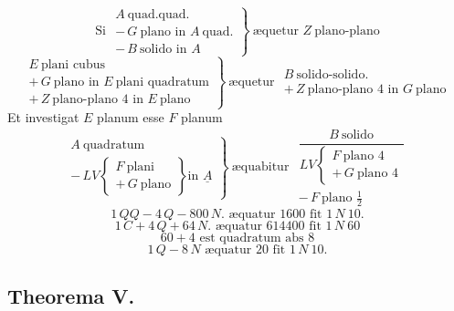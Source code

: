 \documentclass[11pt,a4paper]{article}
\begin{document}
\[ \text{Si } \left.\begin{array}{l} A\ \text{quad.quad.} \\ -\,G\ \text{plano in } A\ \text{quad.} \\ -\,B\ \text{solido in } A \end{array}\right\}\ \text{æquetur } Z\ \text{plano-plano} \]
\[ \left.\begin{array}{l} E\ \text{plani cubus} \\ +\,G\ \text{plano in } E\ \text{plani quadratum} \\ +\,Z\ \text{plano-plano } 4 \text{ in } E\ \text{plano} \end{array}\right\}\ \text{æquetur } \begin{array}{l} B\ \text{solido-solido.} \\ +\,Z\ \text{plano-plano } 4 \text{ in } G\ \text{plano} \end{array} \]
Et investigat $E$ planum esse $F$ planum
\[ \left.\begin{array}{l} A\ \text{quadratum} \\ -\,LV \left\{\begin{array}{l} F\ \text{plani} \\ +\,G\ \text{plano} \end{array}\right\} \text{in } \underline{A} \end{array}\right\}\ \text{æquabitur } \begin{array}{l} \dfrac{B\ \text{solido}}{LV \left\{\begin{array}{l} F\ \text{plano } 4 \\ +\,G\ \text{plano } 4 \end{array}\right.} \\ -\,F\ \text{plano } \frac{1}{2} \end{array} \]
\[ 1\,QQ - 4\,Q - 800\,N. \text{ æquatur } 1600 \text{ fit } 1\,N\ 10. \]
\[ 1\,C + 4\,Q + 64\,N. \text{ æquatur } 614400 \text{ fit } 1\,N\ 60 \]
\[ 60 + 4 \text{ est quadratum abs } 8 \]
\[ 1\,Q - 8\,N \text{ æquatur } 20 \text{ fit } 1\,N\ 10. \]

\subsection*{Theorema V.}
\end{document}
